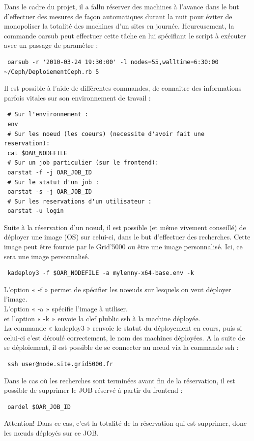 \documentclass[12pt]{report}
\begin{document}
      Dans le cadre du projet, il a fallu réserver des machines à l'avance dans le but d'effectuer des mesures de façon automatiques durant la nuit pour éviter de monopoliser la totalité des machines d'un sites en journée. Heureusement, la commande oarsub peut effectuer cette tâche en lui spécifiant le script à exécuter avec un passage de paramètre :
      \begin{lstlisting}
 oarsub -r '2010-03-24 19:30:00' -l nodes=55,walltime=6:30:00 ~/Ceph/DeploiementCeph.rb 5
      \end{lstlisting}
		  Il est possible à l'aide de différentes commandes, de connaitre des informations parfois vitales sur son environnement de travail :
		  \begin{lstlisting}
 # Sur l'environnement :
 env
 # Sur les noeud (les coeurs) (necessite d'avoir fait une reservation):
 cat $OAR_NODEFILE
 # Sur un job particulier (sur le frontend):
 oarstat -f -j OAR_JOB_ID
 # Sur le statut d'un job :
 oarstat -s -j OAR_JOB_ID
 # Sur les reservations d'un utilisateur :
 oarstat -u login
      \end{lstlisting}
      Suite à la réservation d'un nœud, il est possible (et même vivement conseillé) de déployer une image (OS) sur celui-ci, dans le but d'effectuer des recherches. Cette image peut être fournie par le Grid'5000 ou être une image personnalisé. Ici, ce sera une image personnalisé.
      \begin{lstlisting}
 kadeploy3 -f $OAR_NODEFILE -a mylenny-x64-base.env -k
      \end{lstlisting}
      L'option « -f » permet de spécifier les nœeuds sur lesquels on veut déployer l'image.\\
      L'option « -a » spécifie l'image à utiliser.\\
      et l'option « -k » envoie la clef plublic ssh à la machine déployée.\\
      La commande « kadeploy3 » renvoie le statut du déployement en cours, puis si celui-ci c'est déroulé correctement, le nom des machines déployées. A la suite de se déploiement, il est possible de se connecter au nœud via la commande ssh :
      \begin{lstlisting}
 ssh user@node.site.grid5000.fr
      \end{lstlisting}
      Dans le cas où les recherches sont terminées avant fin de la réservation, il est possible de supprimer le JOB réservé à partir du frontend :
      \begin{lstlisting}
 oardel $OAR_JOB_ID
      \end{lstlisting}
      Attention! Dans ce cas, c'est la totalité de la réservation qui est supprimer, donc les nœuds déployés sur ce JOB.
      
\end{document}
